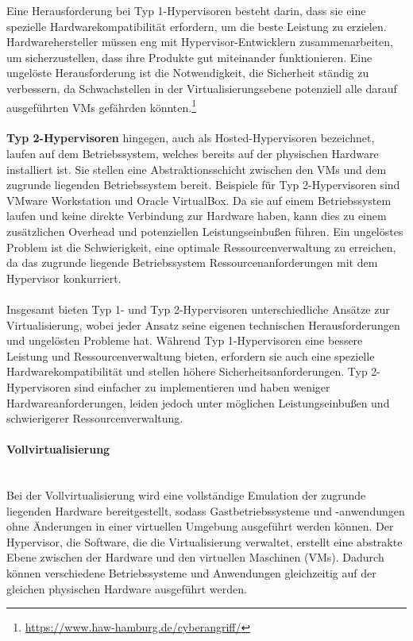 \documentclass[../vs-script-first-v01.tex]{subfiles}
\begin{document}
Eine Herausforderung bei Typ 1-Hypervisoren besteht darin, dass sie eine spezielle Hardwarekompatibilität erfordern, um die beste Leistung zu erzielen. Hardwarehersteller müssen eng mit Hypervisor-Entwicklern zusammenarbeiten, um sicherzustellen, dass ihre Produkte gut miteinander funktionieren. Eine ungelöste Herausforderung ist die Notwendigkeit, die Sicherheit ständig zu verbessern, da Schwachstellen in der Virtualisierungsebene potenziell alle darauf ausgeführten VMs gefährden könnten.\footnote{\url{https://www.haw-hamburg.de/cyberangriff/}}
\\\\
\textbf{Typ 2-Hypervisoren} hingegen, auch als Hosted-Hypervisoren bezeichnet, laufen auf dem Betriebssystem, welches bereits auf der physischen Hardware installiert ist. Sie stellen eine Abstraktionsschicht zwischen den VMs und dem zugrunde liegenden Betriebssystem bereit. Beispiele für Typ 2-Hypervisoren sind VMware Workstation und Oracle VirtualBox.
Da sie auf einem Betriebssystem laufen und keine direkte Verbindung zur Hardware haben, kann dies zu einem zusätzlichen Overhead und potenziellen Leistungseinbußen führen. Ein ungelöstes Problem ist die Schwierigkeit, eine optimale Ressourcenverwaltung zu erreichen, da das zugrunde liegende Betriebssystem Ressourcenanforderungen mit dem Hypervisor konkurriert.
\\\\
Insgesamt bieten Typ 1- und Typ 2-Hypervisoren unterschiedliche Ansätze zur Virtualisierung, wobei jeder Ansatz seine eigenen technischen Herausforderungen und ungelösten Probleme hat. Während Typ 1-Hypervisoren eine bessere Leistung und Ressourcenverwaltung bieten, erfordern sie auch eine spezielle Hardwarekompatibilität und stellen höhere Sicherheitsanforderungen. Typ 2-Hypervisoren sind einfacher zu implementieren und haben weniger Hardwareanforderungen, leiden jedoch unter möglichen Leistungseinbußen und schwierigerer Ressourcenverwaltung.

\paragraph{Vollvirtualisierung\\\\}
Bei der Vollvirtualisierung wird eine vollständige Emulation der zugrunde liegenden Hardware bereitgestellt, sodass Gastbetriebssysteme und -anwendungen ohne Änderungen in einer virtuellen Umgebung ausgeführt werden können. Der Hypervisor, die Software, die die Virtualisierung verwaltet, erstellt eine abstrakte Ebene zwischen der Hardware und den virtuellen Maschinen (VMs). Dadurch können verschiedene Betriebssysteme und Anwendungen gleichzeitig auf der gleichen physischen Hardware ausgeführt werden.
\end{document}
